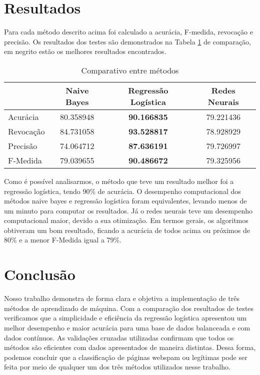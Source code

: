 \documentclass[10pt, conference, compsocconf]{IEEEtran}
\begin{document}
\section{Resultados}\label{resultados}
Para cada método descrito acima foi calculado a acurácia, F-medida, revocação e precisão. Os resultados dos testes são demonstrados na Tabela \ref{table:table_comparacao} de comparação, em negrito estão os melhores resultados encontrados.
\\
\begin{table}[!htpb]
\begin{small} 
\centering
\begin{tabular}{lccc}
\hline
                 & Naive Bayes & Regressão Logística  & Redes Neurais \\
\hline
Acurácia    & 80.358948  &\textbf{90.166835} & 79.221436 \\
Revocação & 84.731058  & \textbf{93.528817} & 78.928929\\
Precisão    & 74.064712  & \textbf{87.636191} & 79.726997\\
F-Medida   & 79.039655  & \textbf{90.486672}  & 79.325956\\
\hline
\end{tabular}
\caption{Comparativo entre métodos}
\label{table:table_comparacao}
\end{small}
\end{table} 

Como é possível analisarmos, o método que teve um resultado melhor foi a regressão logística, tendo 90\% de acurácia. O desempenho computacional dos métodos naive bayes e regressão logística foram equivalentes, levando menos de um minuto para computar os resultados. Já o redes neurais teve um desempenho computacional maior, devido a sua otimização.
Em termos gerais, os algoritmos obtiveram um bom resultado, ficando a acurácia de todos acima ou próximos de 80\% e a menor F-Medida igual a 79\%.

\section{Conclusão}\label{conclusao}
Nosso trabalho demonstra de forma clara e objetiva a implementação de três métodos de aprendizado de máquina. Com a comparação dos resultados de testes verificamos que a simplicidade e eficiência da regressão logística apresentou um melhor desempenho e maior acurácia para uma base de dados balanceada e com dados contínuos. As validações cruzadas utilizadas confirmam que todos os métodos são eficientes com dados apresentados de maneira distintas.
Dessa forma, podemos concluir que a classificação de páginas webspam ou legítimas pode ser feita por meio de qualquer um dos três métodos utilizados nesse trabalho.
\end{document}
